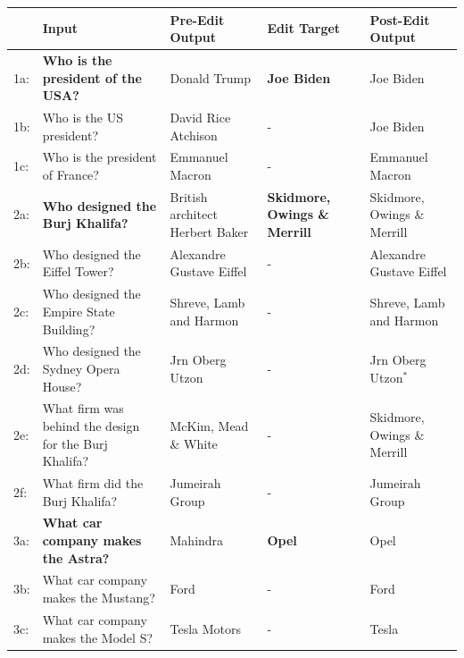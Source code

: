 \documentclass{article}
\newcommand{\greenyes}{\textcolor{Green}{\ding{51}}}
\newcommand{\redno}{\textcolor{Red}{\ding{55}}}
\begin{document}
\begin{appendix}
\begingroup
\setlength{\tabcolsep}{4pt} %
\begin{table}
    \small
    \centering
    \vspace{5mm}
    \begin{tabular}{l@{\hspace{2pt}}>{\raggedright\arraybackslash}p{}>{\raggedright\arraybackslash}p{}>{\raggedright\arraybackslash}p{}>{\raggedright\arraybackslash}p{}}
        \toprule
        & \normalsize Input & \normalsize Pre-Edit Output & \normalsize Edit Target & \normalsize Post-Edit Output \\
        \midrule
        1a: & \textbf{Who is the president of the USA?} & Donald Trump \redno & \textbf{Joe Biden} & Joe Biden \greenyes \\
        1b: & Who is the US president? & David Rice Atchison \redno & - & Joe Biden \greenyes \\
        1c: & Who is the president of France? & Emmanuel Macron \greenyes & - & Emmanuel Macron \greenyes \\
        \midrule
        2a: & \textbf{Who designed the Burj Khalifa?} & British architect Herbert Baker \redno & \textbf{Skidmore, Owings \& Merrill} & Skidmore, Owings \& Merrill \greenyes \\
        2b: & Who designed the Eiffel Tower? & Alexandre Gustave Eiffel \greenyes & - & Alexandre Gustave Eiffel \greenyes \\
        2c: & Who designed the Empire State Building? & Shreve, Lamb and Harmon \greenyes & - & Shreve, Lamb and Harmon \greenyes \\
        2d: & Who designed the Sydney Opera House? & Jrn Oberg Utzon \greenyes & - & Jrn Oberg Utzon$^*$ \greenyes \\
        2e: & What firm was behind the design for the Burj Khalifa? & McKim, Mead \& White \redno & - & Skidmore, Owings \& Merrill \greenyes \\
        2f: & What firm did the Burj Khalifa? & Jumeirah Group \redno & - & Jumeirah Group \redno \\
        \midrule
        3a: & \textbf{What car company makes the Astra?} & Mahindra \redno & \textbf{Opel} & Opel \greenyes \\
        3b: & What car company makes the Mustang? & Ford \greenyes & - & Ford \greenyes \\
        3c: & What car company makes the Model S? & Tesla Motors \greenyes & - & Tesla \greenyes \\

\end{tabular}
\end{table}
\end{appendix}
\end{document}
